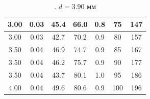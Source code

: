 \documentclass[a4paper]{article}
\begin{document}
\begin{itemize}
\begin{table}[]
\begin{tabular}{|c|c|c|c|c|c|c|}
3.00  & 0.03            & 45.4   & 66.0                  & 0.8                          & \cellcolor[HTML]{FF0000}75  & \cellcolor[HTML]{FF0000}147 \\ \hline
3.00  & 0.03            & 42.7   & 70.2                  & 0.9                          & \cellcolor[HTML]{FF0000}80  & \cellcolor[HTML]{FF0000}157 \\ \hline
3.50  & 0.04            & 46.9   & 74.7                  & 0.9                          & \cellcolor[HTML]{FF0000}85  & \cellcolor[HTML]{FF0000}167 \\ \hline
3.50  & 0.04            & 46.2   & 75.7                  & 0.9                          & \cellcolor[HTML]{FF0000}90  & \cellcolor[HTML]{FF0000}177 \\ \hline
3.50  & 0.04            & 43.7   & 80.1                  & 1.0                          & \cellcolor[HTML]{FF0000}95  & \cellcolor[HTML]{FF0000}186 \\ \hline
4.00  & 0.04            & 49.6   & 80.6                  & 0.9                          & \cellcolor[HTML]{FF0000}100 & \cellcolor[HTML]{FF0000}196 \\ \hline
\end{tabular}
\caption{. $d = 3.90$ мм}
\end{table}


\end{itemize}
\end{document}
